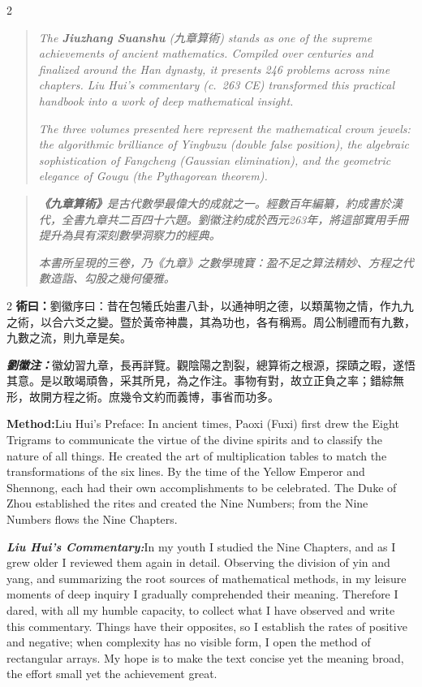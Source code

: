 \documentclass[11pt,a4paper]{article}
\newcommand{\cnshu}{\textcolor{cnlabelfg}{\textbf{術曰：}}}
\newcommand{\cnzhu}{\textcolor{commentarycolor}{\textit{\textbf{劉徽注：}}}}
\newcommand{\enshu}{\textcolor{enlabelfg}{\textbf{Method:}}}
\newcommand{\enzhu}{\textcolor{enlabelfg}{\textit{\textbf{Liu Hui's Commentary:}}}}
\begin{document}
\begin{paracol}{2}
\switchcolumn[0]
\begin{quote}\color{quotecolor}\small
\textit{The \textbf{Jiuzhang Suanshu} (九章算術) stands as one of the supreme achievements of ancient mathematics. Compiled over centuries and finalized around the Han dynasty, it presents 246 problems across nine chapters. Liu Hui's commentary (c.~263 CE) transformed this practical handbook into a work of deep mathematical insight.}

\textit{The three volumes presented here represent the mathematical crown jewels: the algorithmic brilliance of Yingbuzu (double false position), the algebraic sophistication of Fangcheng (Gaussian elimination), and the geometric elegance of Gougu (the Pythagorean theorem).}
\end{quote}

\switchcolumn[1]
\begin{quote}\color{quotecolor}\small
\textit{\textbf{《九章算術》}是古代數學最偉大的成就之一。經數百年編纂，約成書於漢代，全書九章共二百四十六題。劉徽注約成於西元263年，將這部實用手冊提升為具有深刻數學洞察力的經典。}

\textit{本書所呈現的三卷，乃《九章》之數學瑰寶：盈不足之算法精妙、方程之代數造詣、勾股之幾何優雅。}
\end{quote}
\end{paracol}

\vspace{0.5cm}

\begin{paracol}{2}
\switchcolumn[0]
\cnshu 劉徽序曰：昔在包犧氏始畫八卦，以通神明之德，以類萬物之情，作九九之術，以合六爻之變。暨於黃帝神農，其為功也，各有稱焉。周公制禮而有九數，九數之流，則九章是矣。

\cnzhu 徽幼習九章，長再詳覽。觀陰陽之割裂，總算術之根源，探賾之暇，遂悟其意。是以敢竭頑魯，采其所見，為之作注。事物有對，故立正負之率；錯綜無形，故開方程之術。庶幾令文約而義博，事省而功多。

\switchcolumn[1]
\enshu Liu Hui's Preface: In ancient times, Paoxi (Fuxi) first drew the Eight Trigrams to communicate the virtue of the divine spirits and to classify the nature of all things. He created the art of multiplication tables to match the transformations of the six lines. By the time of the Yellow Emperor and Shennong, each had their own accomplishments to be celebrated. The Duke of Zhou established the rites and created the Nine Numbers; from the Nine Numbers flows the Nine Chapters.

\enzhu In my youth I studied the Nine Chapters, and as I grew older I reviewed them again in detail. Observing the division of yin and yang, and summarizing the root sources of mathematical methods, in my leisure moments of deep inquiry I gradually comprehended their meaning. Therefore I dared, with all my humble capacity, to collect what I have observed and write this commentary. Things have their opposites, so I establish the rates of positive and negative; when complexity has no visible form, I open the method of rectangular arrays. My hope is to make the text concise yet the meaning broad, the effort small yet the achievement great.
\end{paracol}
\end{document}
